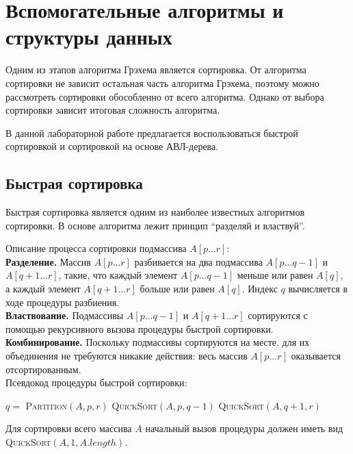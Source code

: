 \section{Вспомогательные алгоритмы и структуры данных}
Одним из этапов алгоритма Грэхема является сортировка. От алгоритма сортировки не зависит остальная часть алгоритма Грэхема, поэтому можно рассмотреть сортировки обособленно от всего алгоритма. Однако от выбора сортировки зависит итоговая сложность алгоритма.

В данной лабораторной работе предлагается воспользоваться быстрой сортировкой и сортировкой на основе АВЛ-дерева.

\subsection{Быстрая сортировка}

Быстрая сортировка\footnotemark{} является одним из наиболее известных алгоритмов сортировки. В основе алгоритма лежит принцип \textquotedblleft{}разделяй и властвуй\textquotedblright{}.


Описание процесса сортировки подмассива $A[p \dots r]$:\\
\textbf{Разделение.} Массив $A[p \dots r]$ разбивается на два подмассива $A[p \dots q-1]$ и $A[q+1 \dots r]$, такие, что каждый элемент $A[p \dots q-1]$ меньше или равен $A[q]$, а каждый элемент $A[q+1 \dots r]$ больше или равен $A[q]$. Индекс $q$ вычисляется в ходе процедуры разбиения.\\
\textbf{Властвование.} Подмассивы $A[p \dots q-1]$ и $A[q+1 \dots r]$ сортируются с помощью рекурсивного вызова процедуры быстрой сортировки.\\
\textbf{Комбинирование.} Поскольку подмассивы сортируются на месте, для их объединения не требуются никакие действия: весь массив $A[p \dots r]$ оказывается отсортированным.\\

\noindent Псевдокод процедуры быстрой сортировки:
\begin{algorithmic}[1]
			\State $q =$ \textsc{Partition}$(A,p,r)$
			\State \textsc{QuickSort}$(A,p,q-1)$
			\State \textsc{QuickSort}$(A,q+1,r)$
		\EndIf
	\EndProcedure
\end{algorithmic}

Для сортировки всего массива $A$ начальный вызов процедуры должен иметь вид
\textsc{QuickSort}$(A,1,A.length)$.

